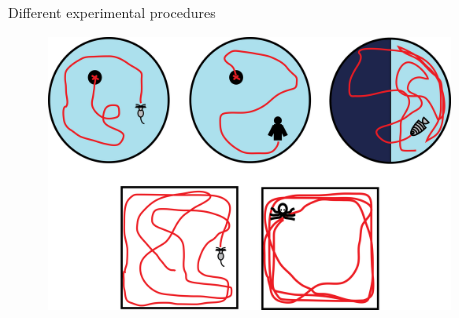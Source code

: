 \documentclass{beamer}
\begin{document}
{\begin{frame}{Different experimental procedures}
	\begin{figure}[H]
		\centering
		\includegraphics[width=0.95\textwidth]{figures/experiments}
	\end{figure}
\end{frame}
          
}
\end{document}
